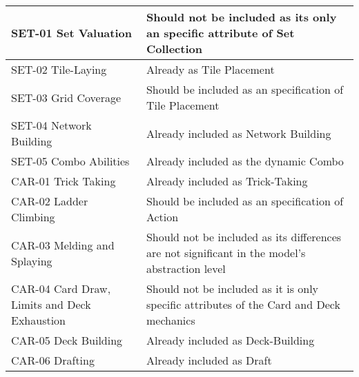 \begin{longtable}{|m{7cm}|m{7cm}|}
        \hline
        SET-01 Set Valuation & Should not be included as its only an specific attribute of Set Collection \\
        \hline
        SET-02 Tile-Laying & Already as Tile Placement \\
        \hline
        SET-03 Grid Coverage & Should be included as an specification of Tile Placement \\
        \hline
        SET-04 Network Building & Already included as Network Building \\
        \hline
        SET-05 Combo Abilities & Already included as the dynamic Combo \\
        \hline
        CAR-01 Trick Taking & Already included as Trick-Taking \\
        \hline
        CAR-02 Ladder Climbing & Should be included as an specification of Action\\
        \hline
        CAR-03 Melding and Splaying & Should not be included as its differences are not significant in the model's abstraction level \\
        \hline
        CAR-04 Card Draw, Limits and Deck Exhaustion & Should not be included as it is only specific attributes of the Card and Deck mechanics \\
        \hline
        CAR-05 Deck Building & Already included as Deck-Building \\
        \hline
        CAR-06 Drafting & Already included as Draft \\
        \hline
      
    \end{longtable}

